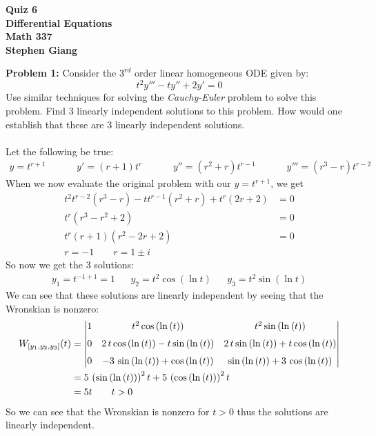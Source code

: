 \documentclass[12pt]{article}
\begin{document}
	
	\begin{center}
		\textbf{Quiz 6} \\
		\textbf{Differential Equations} \\
		\textbf{Math 337} \\
		\textbf{Stephen Giang} \\
	\end{center}

\noindent \textbf{Problem 1: }Consider the $3^{rd}$ order linear homogeneous ODE given by:
	$$
	t^2y''' - ty'' + 2y' = 0
	$$
Use similar techniques for solving the \textit{Cauchy-Euler} problem to solve this problem. Find 3 linearly independent solutions to this problem. How would one establish that these are 3 linearly
independent solutions.	
\\ \\
Let the following be true:
	\begin{align*}
		y = t^{r+1} &&&& y' = (r+1)t^r &&&& y'' = (r^2+r)t^{r-1} &&&& y''' = (r^3 - r)t^{r-2}
	\end{align*}
When we now evaluate the original problem with our $y = t^{r+1}$, we get 
	\begin{align*}
		t^2 t^{r-2} (r^3 - r) - tt^{r-1} (r^2 + r) + t^r(2r + 2) &= 0 \\
		t^r(r^3 - r^2 + 2) &= 0 \\
		t^r(r + 1)(r^2 - 2r + 2) &= 0 \\
		r = -1 \qquad r = 1 \pm i
	\end{align*}
So now we get the 3 solutions:
	\begin{align*}
		y_1 = t^{-1 + 1} = 1 && y_2 = t^2 \cos(\ln t) && y_3 = t^2\sin(\ln t)
	\end{align*}
We can see that these solutions are linearly independent by seeing that the Wronskian is nonzero:
	\begin{align*}
	W_{[y_1,y_2,y_3]}(t) &=
    \begin {vmatrix} 1&{t}^{2}\cos \left( \ln  \left( t
	\right)  \right) &{t}^{2}\sin \left( \ln  \left( t \right)  \right) 
	\\ \noalign{\medskip}0&2\,t\cos \left( \ln  \left( t \right)  \right) 
	-t\sin \left( \ln  \left( t \right)  \right) &2\,t\sin \left( \ln 
	\left( t \right)  \right) +t\cos \left( \ln  \left( t \right) 
	\right) \\ \noalign{\medskip}0&-3\,\sin \left( \ln  \left( t \right) 
	\right) +\cos \left( \ln  \left( t \right)  \right) &\sin \left( \ln 
	\left( t \right)  \right) +3\,\cos \left( \ln  \left( t \right) 
	\right) \end {vmatrix} \\
	&= 5\, \left( \sin \left( \ln  \left( t \right)  \right)  \right) ^{2}t+5
	\, \left( \cos \left( \ln  \left( t \right)  \right)  \right) ^{2}t \\
	&= 5t \qquad t > 0
	\end{align*}
So we can see that the Wronskian is nonzero for $t > 0$ thus the solutions are linearly independent. 
\end{document}
